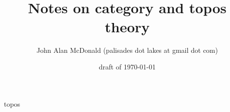 \documentclass[11pt]{PalisadesLakesBook}
\title{Notes on category and topos theory}
\author{John Alan McDonald 
(palisades dot lakes at gmail dot com)}
\date{draft of \today}
\begin{document}
\maketitle
{}
\def\sharedFolder{../../shared/}
{topos}
\end{document}
